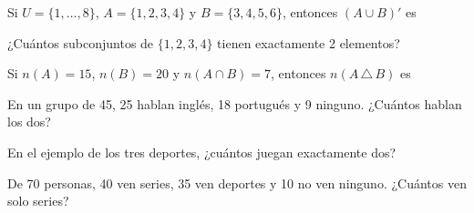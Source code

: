 \bitacora

\evaluacion
\begin{ejercicios}
\item Si $U = \{1, \ldots, 8\}$, $A = \{1, 2, 3, 4\}$ y $B = \{3, 4, 5, 6\}$, entonces $(A \cup B)'$ es
\item ¿Cuántos subconjuntos de $\{1, 2, 3, 4\}$ tienen exactamente 2 elementos?
\item Si $n(A) = 15$, $n(B) = 20$ y $n(A \cap B) = 7$, entonces $n(A \,\triangle\, B)$ es
\item En un grupo de 45, 25 hablan inglés, 18 portugués y 9 ninguno. ¿Cuántos hablan los dos?
\item En el ejemplo de los tres deportes, ¿cuántos juegan exactamente dos?
\item De 70 personas, 40 ven series, 35 ven deportes y 10 no ven ninguno. ¿Cuántos ven solo series?
\end{ejercicios}
